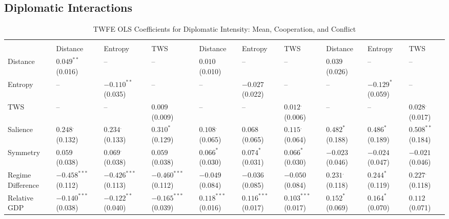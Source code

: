 \documentclass[12pt]{article}
\begin{document}
\subsection{Diplomatic Interactions}
\begin{table}[htbp]\scriptsize
\centering
\caption{TWFE OLS Coefficients for Diplomatic Intensity: Mean, Cooperation, and Conflict}
\renewcommand{\arraystretch}{1.2}
\begin{tabularx}{\textwidth}{
  l
  >{\centering\arraybackslash}X >{\centering\arraybackslash}X >{\centering\arraybackslash}X
  >{\centering\arraybackslash}X >{\centering\arraybackslash}X >{\centering\arraybackslash}X
  >{\centering\arraybackslash}X >{\centering\arraybackslash}X >{\centering\arraybackslash}X
}
\toprule
\rowcolor{gray!20}
 & \multicolumn{3}{c}{\textbf{Mean}} 
 & \multicolumn{3}{c}{\textbf{Cooperation}} 
 & \multicolumn{3}{c}{\textbf{Conflict}} \\
\cmidrule(lr){2-4} \cmidrule(lr){5-7} \cmidrule(lr){8-10}
 & Distance & Entropy & TWS & Distance & Entropy & TWS & Distance & Entropy & TWS \\
\midrule
Distance & $0.049^{**}$ (0.016) & -- & -- & $0.010^{}$ (0.010) & -- & -- & $0.039^{}$ (0.026) & -- & -- \\
Entropy & -- & $-0.110^{**}$ (0.035) & -- & -- & $-0.027^{}$ (0.022) & -- & -- & $-0.129^{*}$ (0.059) & -- \\
TWS & -- & -- & $0.009^{}$ (0.009) & -- & -- & $0.012^{.}$ (0.006) & -- & -- & $0.028^{.}$ (0.017) \\
Salience & $0.248^{.}$ (0.132) & $0.234^{.}$ (0.133) & $0.310^{*}$ (0.129) & $0.108^{.}$ (0.065) & $0.068^{}$ (0.065) & $0.115^{.}$ (0.064) & $0.482^{*}$ (0.188) & $0.486^{*}$ (0.189) & $0.508^{**}$ (0.184) \\
Symmetry & $0.059^{}$ (0.038) & $0.069^{.}$ (0.038) & $0.059^{}$ (0.038) & $0.066^{*}$ (0.030) & $0.074^{*}$ (0.031) & $0.066^{*}$ (0.030) & $-0.023^{}$ (0.046) & $-0.024^{}$ (0.047) & $-0.021^{}$ (0.046) \\
Regime Difference & $-0.458^{***}$ (0.112) & $-0.426^{***}$ (0.113) & $-0.460^{***}$ (0.112) & $-0.049^{}$ (0.084) & $-0.036^{}$ (0.085) & $-0.050^{}$ (0.084) & $0.231^{.}$ (0.118) & $0.244^{*}$ (0.119) & $0.227^{.}$ (0.118) \\
Relative GDP & $-0.140^{***}$ (0.038) & $-0.122^{**}$ (0.040) & $-0.165^{***}$ (0.039) & $0.118^{***}$ (0.016) & $0.116^{***}$ (0.017) & $0.103^{***}$ (0.017) & $0.152^{*}$ (0.069) & $0.164^{*}$ (0.070) & $0.112^{}$ (0.071) \\

\end{tabularx}
\end{table}
\end{document}
